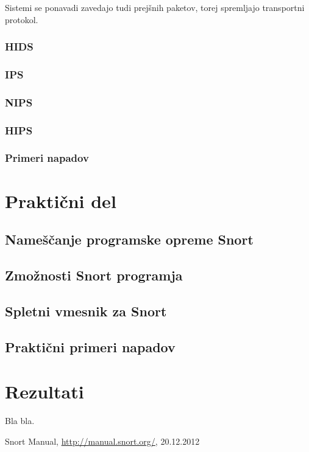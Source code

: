 \documentclass[12pt]{article}
\let\stdsection\section
\renewcommand\section{\newpage\stdsection}
\begin{document}
Sistemi se ponavadi zavedajo tudi prejšnih paketov, torej spremljajo transportni protokol.

\subsubsection{HIDS}
\subsubsection{IPS}
\subsubsection{NIPS}
\subsubsection{HIPS}
\subsubsection{Primeri napadov}


\section{Praktični del}

\subsection{Nameščanje programske opreme Snort}
\subsection{Zmožnosti Snort programja}
\subsection{Spletni vmesnik za Snort}
\subsection{Praktični primeri napadov}

\section{Rezultati}

Bla bla.

\clearpage
{}
\begin{thebibliography}{9}


Snort Manual, \url{http://manual.snort.org/}, 20.12.2012

\end{thebibliography}
\end{document}
